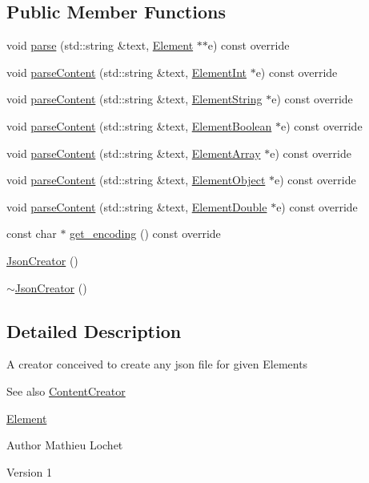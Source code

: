 \subsection*{Public Member Functions}
\begin{DoxyCompactItemize}
\item 
void \mbox{\hyperlink{classJsonCreator_a505ff309c6b144d29478804b0e187c6f}{parse}} (std\+::string \&text, \mbox{\hyperlink{classElement}{Element}} $\ast$$\ast$e) const override
\item 
void \mbox{\hyperlink{classJsonCreator_a0fe34794ee3563c3e0bc35006129fcdc}{parse\+Content}} (std\+::string \&text, \mbox{\hyperlink{classElementInt}{Element\+Int}} $\ast$e) const override
\item 
void \mbox{\hyperlink{classJsonCreator_acf8d7cd3dcbb669fd9eb5dec95e069f3}{parse\+Content}} (std\+::string \&text, \mbox{\hyperlink{classElementString}{Element\+String}} $\ast$e) const override
\item 
void \mbox{\hyperlink{classJsonCreator_a95fb65046a7467b8e48feaf92a62b40c}{parse\+Content}} (std\+::string \&text, \mbox{\hyperlink{classElementBoolean}{Element\+Boolean}} $\ast$e) const override
\item 
void \mbox{\hyperlink{classJsonCreator_a694669d359eb73890a9e9f247c4ebab4}{parse\+Content}} (std\+::string \&text, \mbox{\hyperlink{classElementArray}{Element\+Array}} $\ast$e) const override
\item 
void \mbox{\hyperlink{classJsonCreator_a9f57af1a7925074b8e3e4175f74c886a}{parse\+Content}} (std\+::string \&text, \mbox{\hyperlink{classElementObject}{Element\+Object}} $\ast$e) const override
\item 
void \mbox{\hyperlink{classJsonCreator_a5e841806165fd5cb595d9f7d7c924080}{parse\+Content}} (std\+::string \&text, \mbox{\hyperlink{classElementDouble}{Element\+Double}} $\ast$e) const override
\item 
const char $\ast$ \mbox{\hyperlink{classJsonCreator_ab7313de0040d40a26a9386eb3714120c}{get\+\_\+encoding}} () const override
\item 
\mbox{\hyperlink{classJsonCreator_a71197e5dafee7dd9c04c208413050860}{Json\+Creator}} ()
\item 
\mbox{\hyperlink{classJsonCreator_a061eaa469894ab51ae6c046016da9e40}{$\sim$\+Json\+Creator}} ()
\end{DoxyCompactItemize}


\subsection{Detailed Description}
A creator conceived to create any json file for given Elements \begin{DoxySeeAlso}{See also}
\mbox{\hyperlink{classContentCreator}{Content\+Creator}} 

\mbox{\hyperlink{classElement}{Element}}
\end{DoxySeeAlso}
\begin{DoxyAuthor}{Author}
Mathieu Lochet 
\end{DoxyAuthor}
\begin{DoxyVersion}{Version}
1 
\end{DoxyVersion}


